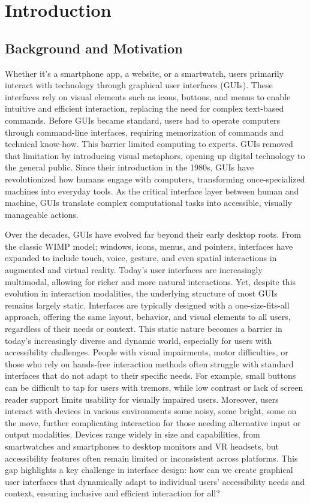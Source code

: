 \chapter{Introduction}
\section{Background and Motivation}
Whether it's a smartphone app, a website, or a smartwatch, users primarily interact with technology through graphical user interfaces (GUIs). These interfaces rely on visual elements such as icons, buttons, and menus to enable intuitive and efficient interaction, replacing the need for complex text-based commands.
Before GUIs became standard, users had to operate computers through command-line interfaces, requiring memorization of commands and technical know-how. This barrier limited computing to experts. GUIs removed that limitation by introducing visual metaphors, opening up digital technology to the general public.
Since their introduction in the 1980s, GUIs have revolutionized how humans engage with computers, transforming once-specialized machines into everyday tools. As the critical interface layer between human and machine, GUIs translate complex computational tasks into accessible, visually manageable actions.

Over the decades, GUIs have evolved far beyond their early desktop roots. From the classic WIMP model; windows, icons, menus, and pointers, interfaces have expanded to include touch, voice, gesture, and even spatial interactions in augmented and virtual reality. Today’s user interfaces are increasingly multimodal, allowing for richer and more natural interactions.
Yet, despite this evolution in interaction modalities, the underlying structure of most GUIs remains largely static. Interfaces are typically designed with a one-size-fits-all approach, offering the same layout, behavior, and visual elements to all users, regardless of their needs or context. This static nature becomes a barrier in today’s increasingly diverse and dynamic world, especially for users with accessibility challenges. People with visual impairments, motor difficulties, or those who rely on hands-free interaction methods often struggle with standard interfaces that do not adapt to their specific needs. 
For example, small buttons can be difficult to tap for users with tremors, while low contrast or lack of screen reader support limits usability for visually impaired users.
Moreover, users interact with devices in various environments some noisy, some bright, some on the move, further complicating interaction for those needing alternative input or output modalities. Devices range widely in size and capabilities, from smartwatches and smartphones to desktop monitors and VR headsets, but accessibility features often remain limited or inconsistent across platforms. This gap highlights a key challenge in interface design: how can we create graphical user interfaces that dynamically adapt to individual users’ accessibility needs and context, ensuring inclusive and efficient interaction for all?

